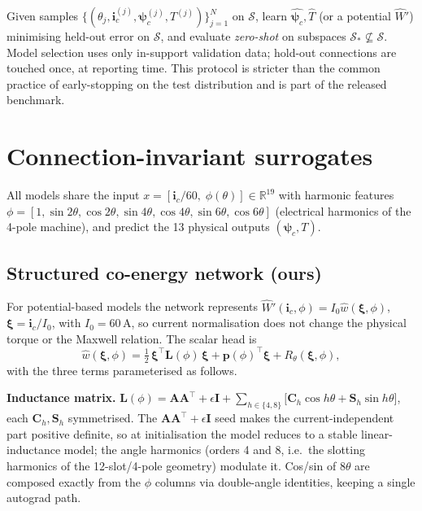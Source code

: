 \documentclass[review]{elsarticle}
\newcommand{\ic}{\boldsymbol{i}_c}
\newcommand{\psic}{\boldsymbol{\psi}_c}
\begin{document}
Given samples
$\{(\theta_j,\ic^{(j)},\psic^{(j)},T^{(j)})\}_{j=1}^N$ on $\mathcal{S}$, learn
$\hat{\psic},\hat{T}$ (or a potential $\hat{W}'$) minimising held-out error
on $\mathcal{S}$, and evaluate \emph{zero-shot} on subspaces
$\mathcal{S}_\ast\not\subseteq\mathcal{S}$. Model selection uses only
in-support validation data; hold-out connections are touched once, at
reporting time. This protocol is stricter than the common practice of
early-stopping on the test distribution and is part of the released
benchmark.

\section{Connection-invariant surrogates}
\label{sec:method}

All models share the input
$x=[\ic/60,\;\phi(\theta)]\in\mathbb{R}^{19}$ with harmonic features
$\phi=[1,\sin2\theta,\cos2\theta,\sin4\theta,\cos4\theta,\sin6\theta,
\cos6\theta]$ (electrical harmonics of the 4-pole machine), and predict the
13 physical outputs $(\psic,T)$.

\subsection{Structured co-energy network (ours)}

For potential-based models the network represents
$\hat W'(\ic,\phi)=I_0\hat w(\boldsymbol{\xi},\phi)$,
$\boldsymbol{\xi}=\ic/I_0$, with $I_0=60$\,A,
so current normalisation does not change the physical torque or the Maxwell
relation. The scalar head is
\begin{equation}
\hat{w}(\boldsymbol{\xi},\phi)
=\tfrac12\,\boldsymbol{\xi}^{\!\top}\mathbf{L}(\phi)\,\boldsymbol{\xi}
+\boldsymbol{p}(\phi)^{\!\top}\boldsymbol{\xi}
+R_\theta(\boldsymbol{\xi},\phi),
\label{eq:struct}
\end{equation}
with the three terms parameterised as follows.

\textbf{Inductance matrix.}
$\mathbf{L}(\phi)=\mathbf{A}\mathbf{A}^{\!\top}+\epsilon\mathbf{I}
+\sum_{h\in\{4,8\}}\big[\mathbf{C}_h\cos h\theta+\mathbf{S}_h\sin
h\theta\big]$, each $\mathbf{C}_h,\mathbf{S}_h$ symmetrised. The
$\mathbf{A}\mathbf{A}^{\!\top}+\epsilon\mathbf{I}$ seed makes the
current-independent part positive definite, so at initialisation the model reduces
to a stable linear-inductance model; the angle harmonics (orders 4 and 8, i.e.\ the
slotting harmonics of the 12-slot/4-pole geometry) modulate it. Cos/sin of
$8\theta$ are composed exactly from the $\phi$ columns via double-angle
identities, keeping a single autograd path.
\end{document}

